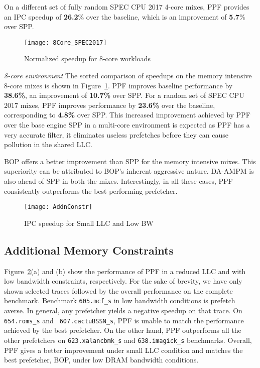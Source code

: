 On a different set of fully random SPEC CPU 2017 4-core mixes, PPF provides an
IPC speedup of \textbf{26.2}\% over the baseline, which is an improvement of
\textbf{5.7}\% over SPP.

\begin{figure}[h]
\texttt{[image: 8Core\_SPEC2017]}
\caption{Normalized speedup for 8-core workloads}
\label{Fig:8Core_SPEC2017}
\end{figure}

\textit{8-core environment} The sorted comparison of speedups on the memory
intensive 8-core mixes is shown in Figure~\ref{Fig:8Core_SPEC2017}.  PPF
improves baseline performance by \textbf{38.6\%}, an improvement of
\textbf{10.7\%} over SPP.  For a random set of SPEC CPU 2017 mixes, PPF
improves performance by \textbf{23.6\%} over the baseline, corresponding to
\textbf{4.8\%} over SPP.  This increased improvement achieved by PPF over the
base engine SPP in a multi-core environment is expected as PPF has a very
accurate filter, it eliminates useless prefetches before they can cause
pollution in the shared LLC.

BOP offers a better improvement than SPP for the memory intensive mixes. This
superiority can be attributed to BOP's inherent aggressive nature.  DA-AMPM is
also ahead of SPP in both the mixes. Interestingly, in all these cases, PPF
consistently outperforms the best performing prefetcher.


\begin{figure}[ht]
\texttt{[image: AddnConstr]}
\caption{IPC speedup for Small LLC and Low BW}
\label{Fig:AddnConstr}
\end{figure}

\subsection{Additional Memory Constraints}
\label{Results-AdditionalMem}

Figure~\ref{Fig:AddnConstr}(a) and (b) show the performance of PPF in a
reduced LLC and with low bandwidth constraints, respectively. For the sake of
brevity, we have only shown selected traces followed by the overall
performance on the complete benchmark.  Benchmark {\tt 605.mcf\_s} in low
bandwidth conditions is prefetch averse.  In general, any prefetcher yields a
negative speedup on that trace.  On {\tt 654.roms\_s} and {\tt
607.cactuBSSN\_s}, PPF is unable to match the performance achieved by the best
prefetcher. On the other hand, PPF outperforms all the other prefetchers on
{\tt 623.xalancbmk\_s} and {\tt 638.imagick\_s} benchmarks.  Overall, PPF gives
a better improvement under small LLC condition and matches the best
prefetcher, BOP, under low DRAM bandwidth conditions.

